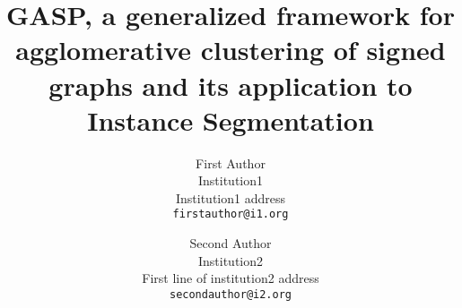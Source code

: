 \documentclass[10pt,twocolumn,letterpaper]{article}
\theoremstyle{definition}
\theoremstyle{remark}
\begin{document}
\title{GASP, a generalized framework for agglomerative clustering of signed graphs and its application to Instance Segmentation} %

\author{First Author\\
Institution1\\
Institution1 address\\
{\tt\small firstauthor@i1.org}
\and
Second Author\\
Institution2\\
First line of institution2 address\\
{\tt\small secondauthor@i2.org}
}

\maketitle
\ificcvfinal\thispagestyle{empty}\fi











% 



{\small


}

\clearpage


    
\end{document}
